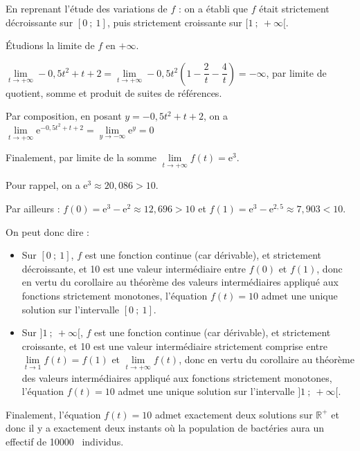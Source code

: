 \documentclass[10pt]{article}
\providecommand{\R}{\mathbb{R}}
\providecommand{\e}{{\mathrm{e}}}
\providecommand{\np}[2][]{{#2~#1}}
\begin{document}
En reprenant l'étude des variations de $f$ : on a établi que $f$ était strictement décroissante sur $[0~;~1]$, puis strictement croissante sur $ [1~;~+\infty[ $.

Étudions la limite de $f$ en $+\infty$.

$\lim\limits_{t \to +\infty} -0,5t^2 + t +2 = \lim\limits_{t \to +\infty} -0,5t^2 \left(1 - \dfrac{2}{t} - \dfrac{4}{t}\right) = -\infty$, par limite de quotient, somme et produit de suites de références.

Par composition, en posant $y = -0,5t^2 + t +2$, on a $\lim\limits_{t \to+\infty} \e^{-0,5t^2 + t +2} = \lim\limits_{y\to -\infty} \e^y = 0$

Finalement, par limite de la somme $\lim\limits_{t \to +\infty} f(t) = \e^3$.

Pour rappel, on a $\e^3 \approx 20,086 > 10$.

Par ailleurs : $f(0) = \e^3 - \e^2 \approx 12,696 >10$ et $f(1) = \e^3 - \e^{2,5} \approx 7,903 < 10$.

On peut donc dire :

\begin{itemize}
\item Sur $ [0~;~1] $, $f$ est une fonction continue (car dérivable), et strictement décroissante, et 10 est une valeur intermédiaire entre $f(0)$ et $f(1)$, donc en vertu du corollaire au théorème des valeurs intermédiaires appliqué aux fonctions strictement monotones, l'équation $f(t)=10$ admet une unique solution sur l'intervalle $ [0~;~1] $.
\item Sur $ ]1~;~+\infty[ $, $f$ est une fonction continue (car dérivable), et strictement croissante, et 10 est une valeur intermédiaire strictement comprise entre $\lim\limits_{t \to 1}f(t)=f(1)$ et $\lim\limits_{t\to +\infty}f(t)$, donc en vertu du corollaire au théorème des valeurs intermédiaires appliqué aux fonctions strictement monotones, l'équation $f(t)=10$ admet une unique solution sur l'intervalle $]1~;~+\infty[$.
\end{itemize}

Finalement, l'équation $f(t) = 10$ admet exactement deux solutions sur $\R^+$ et donc il y a exactement deux instants où la population de bactéries aura un effectif de \np{10000} individus.
\end{document}
